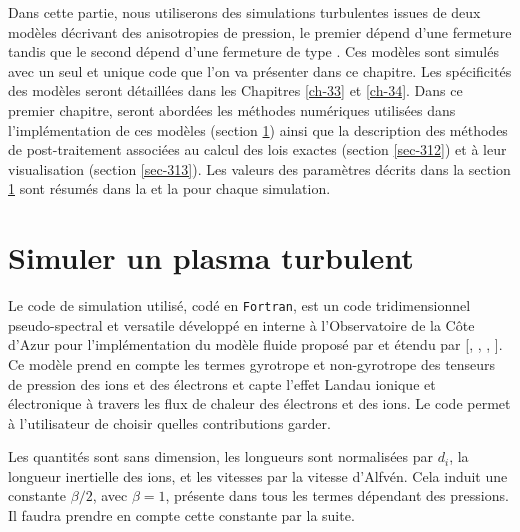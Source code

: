  Dans cette partie, nous utiliserons des simulations turbulentes issues de deux modèles décrivant des anisotropies de pression, le premier dépend d'une fermeture  tandis que le second dépend d'une fermeture de type . Ces modèles sont simulés avec un seul et unique code que l'on va présenter dans ce chapitre. Les spécificités des modèles seront détaillées dans les Chapitres \ref{ch-33} et \ref{ch-34}. Dans ce premier chapitre, seront abordées les méthodes numériques utilisées dans l'implémentation de ces modèles (section \ref{sec-311}) ainsi que la description des méthodes de post-traitement associées au calcul des lois exactes (section \ref{sec-312}) et à leur visualisation (section \ref{sec-313}). Les valeurs des paramètres décrits dans la section \ref{sec-311} sont résumés dans la  et la  pour chaque simulation.
 

\section{Simuler un plasma turbulent }
\label{sec-311}

 Le code de simulation utilisé, codé en \verb|Fortran|, est un code tridimensionnel pseudo-spectral et versatile développé en interne à l'Observatoire de la Côte d'Azur pour l'implémentation du modèle fluide proposé par \cite{snyder_landau_1997} et étendu par [\cite{goswami_landau_2005}, \cite{passot_collisionless_2007}, \cite{passot_extending_2012}, \cite{sulem_landau_2015}]. Ce modèle prend en compte les termes gyrotrope et non-gyrotrope des tenseurs de pression des ions et des électrons et capte l'effet Landau ionique et électronique à travers les flux de chaleur des électrons et des ions. Le code permet à l'utilisateur de choisir quelles contributions garder.
 
 Les quantités sont sans dimension, les longueurs sont normalisées par $d_i$, la longueur inertielle des ions, et les vitesses par la vitesse d'Alfvén. Cela induit une constante $\beta/2$, avec $\beta = 1$, présente dans tous les termes dépendant des pressions. Il faudra prendre en compte cette constante par la suite. 
 
